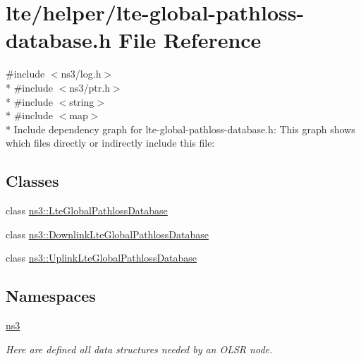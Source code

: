 \hypertarget{lte-global-pathloss-database_8h}{}\section{lte/helper/lte-\/global-\/pathloss-\/database.h File Reference}
\label{lte-global-pathloss-database_8h}
{\ttfamily \#include $<$ns3/log.\+h$>$}\\*
{\ttfamily \#include $<$ns3/ptr.\+h$>$}\\*
{\ttfamily \#include $<$string$>$}\\*
{\ttfamily \#include $<$map$>$}\\*
Include dependency graph for lte-\/global-\/pathloss-\/database.h\+:
This graph shows which files directly or indirectly include this file\+:
\subsection*{Classes}
\begin{DoxyCompactItemize}
\item 
class \hyperlink{classns3_1_1LteGlobalPathlossDatabase}{ns3\+::\+Lte\+Global\+Pathloss\+Database}
\item 
class \hyperlink{classns3_1_1DownlinkLteGlobalPathlossDatabase}{ns3\+::\+Downlink\+Lte\+Global\+Pathloss\+Database}
\item 
class \hyperlink{classns3_1_1UplinkLteGlobalPathlossDatabase}{ns3\+::\+Uplink\+Lte\+Global\+Pathloss\+Database}
\end{DoxyCompactItemize}
\subsection*{Namespaces}
\begin{DoxyCompactItemize}
\item 
 \hyperlink{namespacens3}{ns3}
\begin{DoxyCompactList}\small\item\em Here are defined all data structures needed by an O\+L\+SR node. \end{DoxyCompactList}\end{DoxyCompactItemize}
